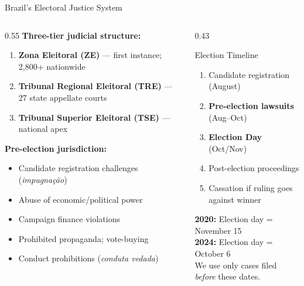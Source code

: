\documentclass[aspectratio=169,10pt]{beamer}
\begin{document}
\begin{frame}{Brazil's Electoral Justice System}
\begin{columns}[T]
\begin{column}{0.55\textwidth}
\textbf{Three-tier judicial structure:}
\begin{enumerate}
  \item \textbf{Zona Eleitoral (ZE)} --- first instance; 2,800+ nationwide
  \item \textbf{Tribunal Regional Eleitoral (TRE)} --- 27 state appellate courts
  \item \textbf{Tribunal Superior Eleitoral (TSE)} --- national apex
\end{enumerate}
\bigskip
\textbf{Pre-election jurisdiction:}
\begin{itemize}
  \item Candidate registration challenges (\emph{impugna\c{c}\~{a}o})
  \item Abuse of economic/political power
  \item Campaign finance violations
  \item Prohibited propaganda; vote-buying
  \item Conduct prohibitions (\emph{conduta vedada})
\end{itemize}
\end{column}
\begin{column}{0.43\textwidth}
\begin{block}{Election Timeline}
  \footnotesize
  \begin{enumerate}
    \item Candidate registration (August)
    \item \textbf{Pre-election lawsuits} (Aug--Oct)
    \item \textbf{Election Day} (Oct/Nov)
    \item Post-election proceedings
    \item Cassation if ruling goes against winner
  \end{enumerate}
\end{block}
\bigskip
\footnotesize
\textbf{2020:} Election day = November 15\\
\textbf{2024:} Election day = October 6\\[4pt]
We use only cases filed \emph{before} these dates.
\end{column}
\end{columns}
\end{frame}
\end{document}
